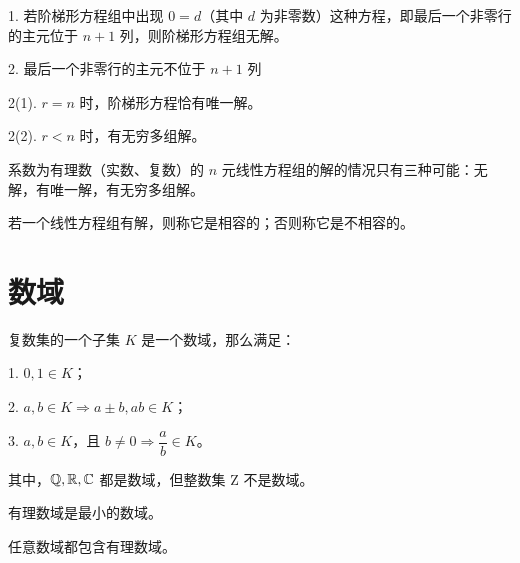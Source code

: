 1. 若阶梯形方程组中出现 $0=d$（其中 $d$ 为非零数）这种方程，即最后一个非零行的主元位于 $n+1$ 列，则阶梯形方程组无解。

2. 最后一个非零行的主元不位于 $n+1$ 列

2(1). $r=n$ 时，阶梯形方程恰有唯一解。

2(2). $r<n$ 时，有无穷多组解。

\begin{theorem}
	系数为有理数（实数、复数）的 $n$ 元线性方程组的解的情况只有三种可能：无解，有唯一解，有无穷多组解。
\end{theorem}

若一个线性方程组有解，则称它是相容的；否则称它是不相容的。

\section{数域}

\begin{definition}
	复数集的一个子集 $K$ 是一个数域，那么满足：
	
	1. $0,1\in K$；
	
	2. $a,b\in K \Rightarrow a \pm b,ab\in K$；
	
	3. $a,b \in K$，且 $b\ne 0 \Rightarrow \dfrac{a}{b}\in K$。
\end{definition}

其中，$\mathbb{Q},\mathbb{R},\mathbb{C}$ 都是数域，但整数集 $\mathrm{Z}$ 不是数域。

有理数域是最小的数域。

\begin{theorem}
	任意数域都包含有理数域。
\end{theorem}


